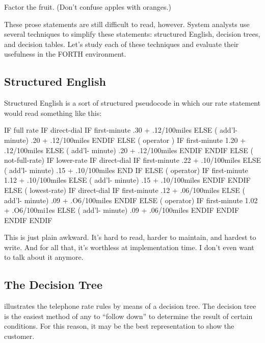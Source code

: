 \begin{tip}
Factor the fruit. (Don't confuse apples with oranges.)
\end{tip}

\noindent These prose statements are still difficult to read, however. System
analysts use several techniques to simplify these statements: structured
English, decision trees, and decision tables. Let's study each of these
techniques and evaluate their usefulness in the FORTH environment.

\subsection{Structured English}

\noindent Structured English is a sort of structured pseudocode in which our rate
statement would read something like this:

\begin{Code}
IF full rate
   IF direct-dial
      IF first-minute
	 .30 + .12/100miles
      ELSE ( add'l- minute)
	 .20 + .12/100miles
      ENDIF
   ELSE ( operator )
      IF first-minute
	 1.20 + .12/100miles
      ELSE ( add'l- minute)
	 .20 + .12/100miles
      ENDIF
   ENDIF
ELSE ( not-full-rate)
   IF lower-rate
      IF direct-dial
	 IF first-minute
	    .22 + .10/100miles
	 ELSE ( add'l- minute)
	    .15 + .10/100miles
	 END IF
      ELSE ( operator)
	 IF first-minute
	    1.12 + .10/100miles
	 ELSE ( add'l- minute)
	    .15 + .10/100miles
	 ENDIF
      ENDIF
   ELSE ( lowest-rate)
      IF direct-dial
	 IF first-minute
	    .12 + .06/100miles
	 ELSE ( add'l- minute)
	    .09 + .O6/100miles
	 ENDIF
      ELSE ( operator)
	 IF first-minute
	    1.02 + .O6/100mi1es
	 ELSE ( add'l- minute)
	    .09 + .06/100miles
	 ENDIF
      ENDIF
   ENDIF
ENDIF
\end{Code}

\noindent This is just plain awkward. It's hard to read, harder to maintain, and
hardest to write. And for all that, it's worthless at implementation time.
I don't even want to talk about it anymore.

\subsection{The Decision Tree}

\noindent {} illustrates the telephone rate rules by means of a decision tree.
The decision tree is the easiest method of any to ``follow down'' to
determine the result of certain conditions. For this reason, it may be the best
representation to show the customer.

